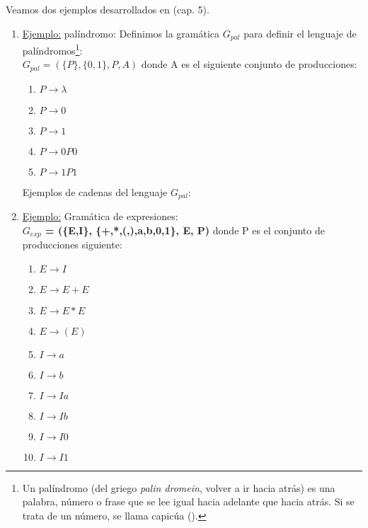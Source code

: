 Veamos dos ejemplos desarrollados en \cite{gramatica} (cap. 5).

\begin{enumerate}
\item \underline{Ejemplo:} palíndromo:
Definimos la gramática $G_{pal}$ para definir el lenguaje de palíndromos\footnote{Un palíndromo (del griego \textit{palin dromein}, volver a ir hacia atrás) es una palabra, número o frase que se lee igual hacia adelante que hacia atrás. Si se trata de un número, se llama capicúa ().}: \\
$G_{pal} = (\{P\},\{0,1\},P,A)$
donde A es el siguiente conjunto de producciones:
\begin{enumerate}
\item $P \rightarrow \lambda$
\item $P \rightarrow 0$
\item $P \rightarrow 1$
\item $P \rightarrow 0 P 0$
\item $P \rightarrow 1 P 1$
\end{enumerate}

Ejemplos de cadenas del lenguaje $G_{pal}$:

\item \underline{Ejemplo:} Gramática de expresiones:\\
\textbf{$G_{exp}$ = (\{E,I\}, \{+,*,(,),a,b,0,1\}, E, P)} donde P es el conjunto de producciones siguiente:
\begin{enumerate}
\item $E \rightarrow I$
\item $E \rightarrow E + E$
\item $E \rightarrow E * E$
\item $E \rightarrow (E)$
\item $I \rightarrow a$
\item $I \rightarrow b$
\item $I \rightarrow Ia$
\item $I \rightarrow Ib$
\item $I \rightarrow I0$
\item $I \rightarrow I1$
\end{enumerate}
\end{enumerate}


